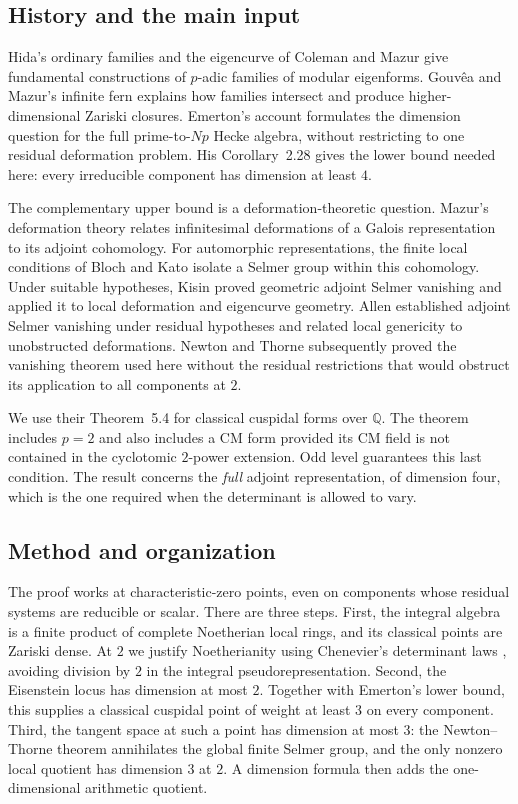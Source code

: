 \documentclass[11pt]{article}
\theoremstyle{remark}
\numberwithin{equation}{section}
\newcommand{\Q}{\mathbb Q}
\begin{document}
\subsection*{History and the main input}
Hida's ordinary families \cite{Hida86} and the eigencurve of Coleman and
Mazur \cite{ColemanMazur98} give fundamental constructions of $p$-adic
families of modular eigenforms. Gouv\^ea and Mazur's infinite fern
\cite{GouveaMazur98} explains how families intersect and produce
higher-dimensional Zariski closures. Emerton's account
\cite{Emerton11} formulates the dimension question for the full
prime-to-$Np$ Hecke algebra, without restricting to one residual
deformation problem. His Corollary~2.28 gives the lower bound needed
here: every irreducible component has dimension at least $4$.

The complementary upper bound is a deformation-theoretic question.
Mazur's deformation theory \cite{Mazur89} relates infinitesimal
deformations of a Galois representation to its adjoint cohomology.
For automorphic representations, the finite local conditions of
Bloch and Kato \cite{BlochKato90} isolate a Selmer group within this
cohomology. Under suitable hypotheses, Kisin \cite{Kisin04} proved
geometric adjoint Selmer vanishing and applied it to local deformation
and eigencurve geometry. Allen \cite{Allen16} established adjoint Selmer vanishing
under residual hypotheses and related local genericity to unobstructed
deformations. Newton and Thorne \cite{NewtonThorne23} subsequently
proved the vanishing theorem used here without the residual restrictions
that would obstruct its application to all components at $2$.

We use their Theorem~5.4 for classical cuspidal forms over $\Q$.
The theorem includes $p=2$ and also includes a CM form provided its
CM field is not contained in the cyclotomic $2$-power extension.
Odd level guarantees this last condition. The result concerns the
\emph{full} adjoint representation, of dimension four, which is the
one required when the determinant is allowed to vary.

\subsection*{Method and organization}
The proof works at characteristic-zero points, even on components
whose residual systems are reducible or scalar. There are three steps.
First, the integral algebra is a finite product of complete Noetherian
local rings, and its classical points are Zariski dense. At $2$ we
justify Noetherianity using Chenevier's determinant laws
\cite{Chenevier14}, avoiding division by $2$ in the integral
pseudorepresentation. Second, the Eisenstein locus has dimension at
most $2$. Together with Emerton's lower bound, this supplies a classical
cuspidal point of weight at least $3$ on every component. Third, the
tangent space at such a point has dimension at most $3$: the
Newton--Thorne theorem annihilates the global finite Selmer group,
and the only nonzero local quotient has dimension $3$ at $2$.
A dimension formula then adds the one-dimensional arithmetic quotient.
\end{document}
